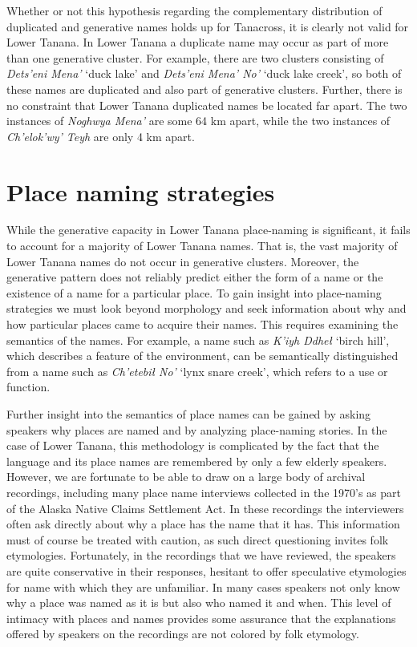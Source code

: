 Whether or not this hypothesis regarding the complementary distribution of duplicated and generative names holds up for Tanacross, it is clearly not valid for Lower Tanana. In Lower Tanana a duplicate name may occur as part of more than one generative cluster. For example, there are two clusters consisting of \textit{Dets’eni Mena’} ‘duck lake’ and \textit{Dets’eni Mena’ No’} ‘duck lake creek’, so both of these names are duplicated and also part of generative clusters. Further, there is no constraint that Lower Tanana duplicated names be located far apart. The two instances of \textit{Noghwya Mena’} are some 64 km apart, while the two instances of \textit{Ch’elok’wy’ Teyh}  are only 4 km apart.

\section{Place naming strategies}

While the generative capacity in Lower Tanana place-naming is significant, it fails to account for a majority of Lower Tanana names. That is, the vast majority of Lower Tanana names do not occur in generative clusters. Moreover, the generative pattern does not reliably predict either the form of a name or the existence of a name for a particular place. To gain insight into place-naming strategies we must look beyond morphology and seek information about why and how particular places came to acquire their names. This requires examining the semantics of the names. For example, a name such as \textit{K'iyh Ddheł} `birch hill', which describes a  feature of the environment, can be semantically distinguished from a name such as \textit{Ch'etebił No'} `lynx snare creek', which refers to a use or function.  

Further insight into the semantics of place names can be gained  by asking speakers why places are named and by analyzing place-naming stories. In the case of Lower Tanana, this methodology is complicated by the fact that the language and its place names are remembered by only a few elderly speakers. However, we are fortunate to be able to draw on a large body of archival recordings, including many place name interviews collected in the 1970's as part of the Alaska Native Claims Settlement Act. In these recordings  the interviewers often ask directly about why a place has the name that it has. This information must of course be treated with caution, as such direct questioning invites folk etymologies. Fortunately, in the recordings that we have reviewed, the speakers are quite conservative in their responses, hesitant to offer speculative etymologies for name with which they are unfamiliar. In many cases speakers not only know why a place was named as it is but also who named it and when. This level of intimacy with places and names provides some assurance that the explanations offered by speakers on the recordings are not colored by folk etymology. 


